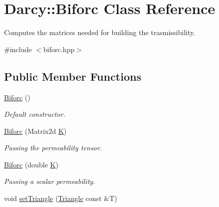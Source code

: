 \hypertarget{classDarcy_1_1Biforc}{\section{Darcy\-:\-:Biforc Class Reference}
\label{classDarcy_1_1Biforc}
}


Computes the matrices needed for building the trasmissibility.  




{\ttfamily \#include $<$biforc.\-hpp$>$}

\subsection*{Public Member Functions}
\begin{DoxyCompactItemize}
\item 
\hypertarget{classDarcy_1_1Biforc_ac0433612f97987156e946ef88af98d80}{\hyperlink{classDarcy_1_1Biforc_ac0433612f97987156e946ef88af98d80}{Biforc} ()}\label{classDarcy_1_1Biforc_ac0433612f97987156e946ef88af98d80}

\begin{DoxyCompactList}\small\item\em Default constructor. \end{DoxyCompactList}\item 
\hypertarget{classDarcy_1_1Biforc_a0efda6216cf08420007a1858ac67ec99}{\hyperlink{classDarcy_1_1Biforc_a0efda6216cf08420007a1858ac67ec99}{Biforc} (Matrix2d \hyperlink{classDarcy_1_1Biforc_a62f510963e60c24ba57380e7ea3337af}{K})}\label{classDarcy_1_1Biforc_a0efda6216cf08420007a1858ac67ec99}

\begin{DoxyCompactList}\small\item\em Passing the permeability tensor. \end{DoxyCompactList}\item 
\hypertarget{classDarcy_1_1Biforc_a46fb42a34795a8ed1a878dd5b232992b}{\hyperlink{classDarcy_1_1Biforc_a46fb42a34795a8ed1a878dd5b232992b}{Biforc} (double \hyperlink{classDarcy_1_1Biforc_a62f510963e60c24ba57380e7ea3337af}{K})}\label{classDarcy_1_1Biforc_a46fb42a34795a8ed1a878dd5b232992b}

\begin{DoxyCompactList}\small\item\em Passing a scalar permeability. \end{DoxyCompactList}\item 
\hypertarget{classDarcy_1_1Biforc_a249cdadea31643807a1299a30b6548a8}{void \hyperlink{classDarcy_1_1Biforc_a249cdadea31643807a1299a30b6548a8}{set\-Triangle} (\hyperlink{classGeometry_1_1Triangle}{Triangle} const \&T)}\label{classDarcy_1_1Biforc_a249cdadea31643807a1299a30b6548a8}


\end{DoxyCompactItemize}
